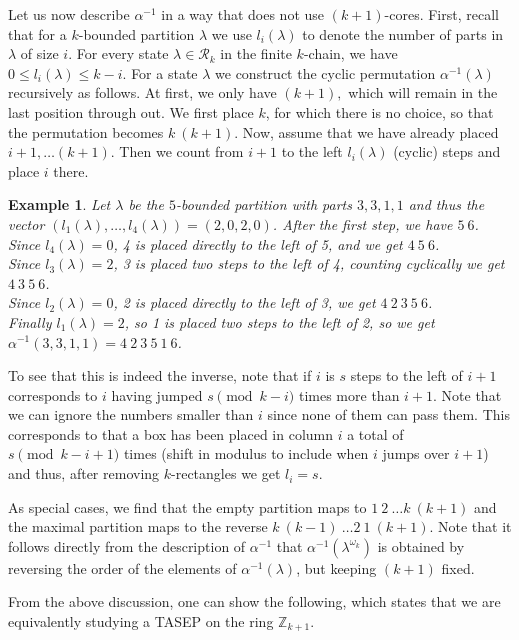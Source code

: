 \documentclass[11pt]{amsart}
\newtheorem{example}[theorem]{Example}
\begin{document}
%


Let us now describe $\alpha^{-1}$ in a way that does not use $(k+1)$-cores.
First, recall that for a $k$-bounded partition $\lambda$ we use $l_i(\lambda)$ to denote the number of parts in $\lambda$ of size $i$. For every state $\lambda\in\mathcal{R}_k$ in the finite $k$-chain, we have $0\le l_i(\lambda)\le k-i$. For a state $\lambda$ we construct the cyclic permutation $\alpha^{-1}(\lambda)$ recursively as follows. At first, we only have $(k+1),$ which will remain in the last position through out. We first place $k$, for which there is no choice, so that the permutation becomes $k\ (k+1)$. Now, assume that we have already placed $i+1,\dots (k+1)$. Then we count from $i+1$ to the left $l_i(\lambda)$ (cyclic) steps and place $i$ there.
 \begin{example} Let $\lambda$ be the $5$-bounded partition with parts $3, 3, 1,1$ and thus the vector $(l_1(\lambda),\dots,l_4(\lambda))=(2,0,2,0)$. After the first step, we have $5\ 6$.
\\
Since $l_4(\lambda)=0$, 4 is placed directly to the left of 5, and we get   $4\ 5\ 6$.\\
Since $l_3(\lambda)=2$, 3 is placed two steps to the left of 4, counting cyclically we get   $4\ 3\ 5\ 6$.\\
Since $l_2(\lambda)=0$, 2 is placed directly to the left of 3, we get   $4\ 2\ 3\ 5\ 6$.\\
Finally $l_1(\lambda)=2$, so 1 is placed two steps to the left of 2, so we get   $\alpha^{-1}(3,3,1,1)=4\ 2\ 3\ 5\ 1\ 6$.
\end{example}

To see that this is indeed the inverse, note that if $i$ is $s$ steps to the left of $i+1$ corresponds to $i$ having jumped $s\pmod{k-i}$ times more than $i+1$. Note that we can ignore the numbers smaller than $i$ since none of them can pass them. This corresponds to that a box has been placed in column $i$ a total of $s\pmod{k-i+1}$ times (shift in modulus to include when $i$ jumps over $i+1$) and thus, after removing $k$-rectangles we get $l_i=s$.

As special cases, we find that the empty partition maps to $1\ 2\ \dots k\ (k+1)$ and the maximal partition maps to the reverse $k\ (k-1)\ \dots 2\ 1 \ (k+1)$.  
Note that it follows directly from the description of $\alpha^{-1}$ that  $\alpha^{-1}(\lambda^{\omega_k})$ is obtained by reversing the order of the elements of $\alpha^{-1}(\lambda)$, but keeping $(k+1)$ fixed. 

From the above discussion, one can show the following, which states that we are equivalently studying a TASEP on the ring $\mathbb{Z}_{k+1}$.
\end{document}
